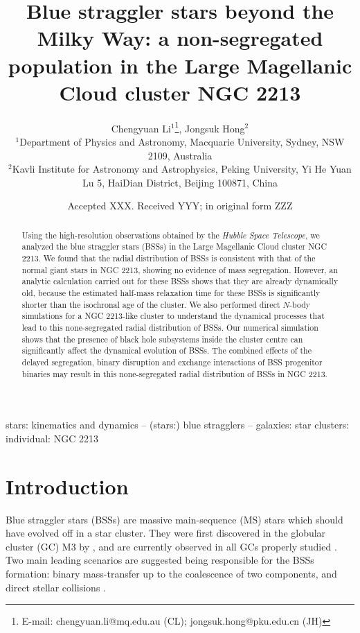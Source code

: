 \documentclass[useAMS,usenatbib,twocolumn]{mnras}
\title[Blue straggler stars in NGC 2213]{Blue straggler stars beyond the Milky Way: a non-segregated population in the Large Magellanic Cloud cluster NGC 2213}
\author[C. Li \& J. Hong]
{Chengyuan Li$^1$\thanks{E-mail: chengyuan.li@mq.edu.au (CL); jongsuk.hong@pku.edu.cn (JH) }, Jongsuk Hong$^2$\\ 
$^1$Department of Physics and Astronomy, Macquarie University, Sydney, NSW 2109, Australia\\
$^2$Kavli Institute for Astronomy and Astrophysics, Peking University, Yi He Yuan Lu 5, HaiDian District, Beijing 100871, China\\
}
\date{Accepted XXX. Received YYY; in original form ZZZ}
\begin{document}
\label{firstpage}
\pagerange{\pageref{firstpage}--\pageref{lastpage}}
\maketitle

\begin{abstract}
Using the high-resolution observations obtained by the {\sl Hubble Space Telescope}, we analyzed the blue straggler stars (BSSs) in the Large Magellanic Cloud cluster NGC 2213. We found that the radial distribution of BSSs is consistent with that of the normal giant stars in NGC 2213, showing no evidence of mass segregation. However, an analytic calculation carried out for these BSSs shows that they are already dynamically old, because the estimated half-mass relaxation time for these BSSs is significantly shorter than the isochronal age of the cluster. 
We also performed direct $N$-body simulations for a NGC 2213-like cluster to understand the dynamical processes that lead to this none-segregated radial distribution of BSSs. Our numerical simulation shows that the presence of black hole subsystems inside the cluster centre can significantly affect the dynamical evolution of BSSs. The combined effects of the delayed segregation, binary disruption and exchange interactions of BSS progenitor binaries may result in this none-segregated radial distribution of BSSs in NGC 2213.
\end{abstract}

\begin{keywords}
stars: kinematics and dynamics -- (stars:) blue stragglers -- galaxies: star clusters: individual: NGC 2213
 \end{keywords}


\section{Introduction}
Blue straggler stars (BSSs) are massive main-sequence (MS) stars which should have evolved off in a star cluster. They were first discovered in the globular cluster (GC) M3 by \cite{Sand53a}, and are currently observed in all GCs properly studied \citep[e.g.,][]{Bald16a}. Two main leading scenarios are suggested being responsible for the BSSs formation: binary mass-transfer up to the coalescence of two components, and direct stellar collisions \citep{Mccr64a,Zinn76a,Hill76a}. 
\end{document}
